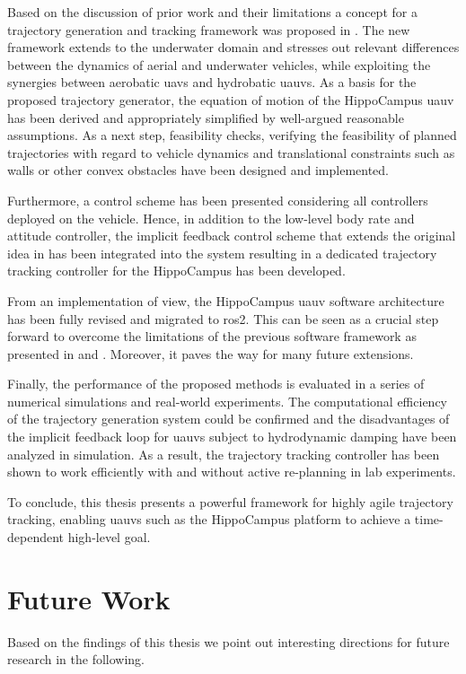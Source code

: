 Based on the discussion of prior work and their limitations a concept for a trajectory generation and tracking framework was proposed in .
The new framework extends \cite{MuellerHehn15} to the underwater domain and stresses out relevant differences between the dynamics of aerial and underwater vehicles, while exploiting the synergies between aerobatic \acp{uav} and hydrobatic \acp{uauv}.
As a basis for the proposed trajectory generator, the equation of motion of the HippoCampus \ac{uauv} has been derived and appropriately simplified by well-argued reasonable assumptions.
As a next step, feasibility checks, verifying the feasibility of planned trajectories with regard to vehicle dynamics and translational constraints such as walls or other convex obstacles have been designed and implemented.

Furthermore, a control scheme has been presented considering all controllers deployed on the vehicle. Hence, in addition to the low-level body rate and attitude controller, the implicit feedback control scheme that extends the original idea in \cite{MuellerHehn15} has been integrated into the system resulting in a dedicated trajectory tracking controller for the HippoCampus has been developed.

From an implementation of view, the HippoCampus \ac{uauv} software architecture has been fully revised and migrated to \ac{ros2}. This can be seen as a crucial step forward to overcome the limitations of the previous software framework as presented in  and . Moreover, it paves the way for many future extensions.

Finally, the performance of the proposed methods is evaluated in a series of numerical simulations and real-world experiments.
The computational efficiency of the trajectory generation system could be confirmed and the disadvantages of the implicit feedback loop for \acp{uauv} subject to hydrodynamic damping have been analyzed in simulation.
As a result, the trajectory tracking controller has been shown to work efficiently with and without active re-planning in lab experiments.

To conclude, this thesis presents a powerful framework for highly agile trajectory tracking, enabling \acp{uauv} such as the HippoCampus platform to achieve a time-dependent high-level goal.

\section{Future Work}
Based on the findings of this thesis we point out interesting directions for future research in the following.

